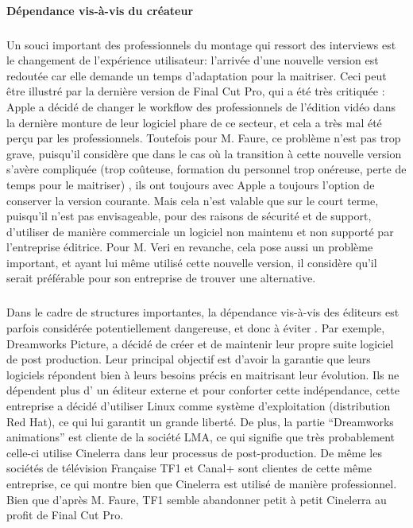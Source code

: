 \paragraph{Dépendance vis-à-vis du créateur}

\subparagraph{}

Un souci important des professionnels du montage qui ressort
des interviews est le changement de l'expérience utilisateur:
l'arrivée d'une nouvelle version est redoutée car elle demande un
temps d'adaptation pour la maitriser.  Ceci peut être illustré par
la dernière version de Final Cut Pro, qui a été très critiquée
\cite{FinalCutProXReviews}: Apple a décidé de changer le workflow
 des professionnels de l'édition vidéo dans la dernière
monture de leur logiciel phare de ce secteur, et cela a très mal été
perçu par les professionnels. Toutefois pour M. Faure, ce problème n'est
pas trop grave, puisqu'il considère que dans le cas où la transition
à cette nouvelle version s'avère compliquée (trop coûteuse, formation
du personnel trop onéreuse, perte de temps pour le maitriser) , ils ont
toujours avec Apple a toujours l'option de conserver la version courante.
Mais cela n'est valable que sur le court terme, puisqu'il n'est pas
envisageable, pour des raisons de sécurité et de support, d'utiliser
de manière commerciale un logiciel non maintenu et non supporté par
l'entreprise éditrice. Pour M. Veri en revanche, cela pose aussi un
problème important, et ayant lui même utilisé cette nouvelle version,
il considère qu'il serait préférable pour son entreprise de trouver
une alternative.

\subparagraph{}

Dans le cadre de structures importantes, la dépendance vis-à-vis
des éditeurs est parfois considérée potentiellement dangereuse,
et donc à éviter . Par exemple, Dreamworks Picture, a décidé de
créer et de maintenir leur propre suite logiciel \cite {Dreamworks}
de post production. Leur principal objectif  est d'avoir la garantie que
leurs logiciels répondent bien à leurs besoins précis en maitrisant
leur évolution. Ils ne dépendent plus d' un éditeur externe et pour
conforter cette indépendance, cette entreprise a décidé d'utiliser
Linux comme système d'exploitation (distribution Red Hat), ce qui lui
garantit un grande liberté. De plus, la partie ``Dreamworks animations''
est cliente de la société LMA, ce qui signifie que très probablement
celle-ci utilise Cinelerra dans leur processus de post-production. De
même les sociétés de télévision Française TF1 et Canal+ sont
clientes de cette même entreprise, ce qui montre bien que Cinelerra
est utilisé de manière professionnel. Bien que d'après M. Faure,
TF1 semble abandonner petit à petit Cinelerra au profit de Final Cut Pro.

